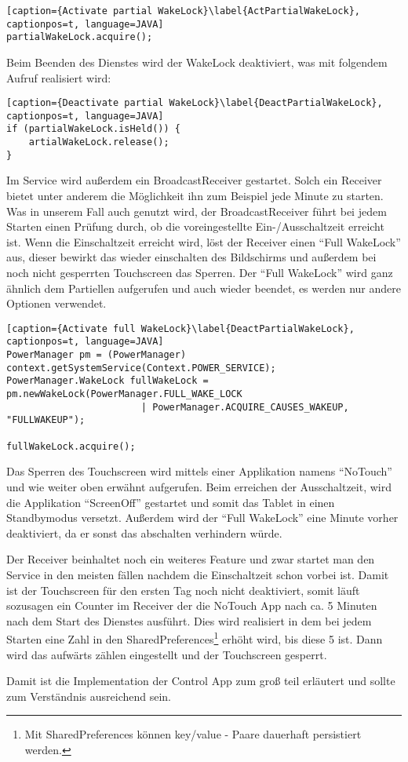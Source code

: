 \begin{flushleft}
\begin{lstlisting}[caption={Activate partial WakeLock}\label{ActPartialWakeLock}, captionpos=t, language=JAVA]
partialWakeLock.acquire();
\end{lstlisting}

Beim Beenden des Dienstes wird der WakeLock deaktiviert, was mit folgendem Aufruf realisiert wird:
\begin{lstlisting}[caption={Deactivate partial WakeLock}\label{DeactPartialWakeLock}, captionpos=t, language=JAVA]
if (partialWakeLock.isHeld()) {
	artialWakeLock.release();
}
\end{lstlisting}

Im Service wird außerdem ein BroadcastReceiver gestartet. Solch ein Receiver bietet unter anderem die Möglichkeit ihn zum Beispiel jede Minute zu starten. Was in unserem Fall auch genutzt wird, der BroadcastReceiver führt bei jedem Starten einen Prüfung durch, ob die voreingestellte Ein-/Ausschaltzeit erreicht ist. Wenn die Einschaltzeit erreicht wird, löst der Receiver einen ``Full WakeLock'' aus, dieser bewirkt das wieder einschalten des Bildschirms und außerdem bei noch nicht gesperrten Touchscreen das Sperren. Der ``Full WakeLock'' wird ganz ähnlich dem Partiellen aufgerufen und auch wieder beendet, es werden nur andere Optionen verwendet.
\begin{lstlisting}[caption={Activate full WakeLock}\label{DeactPartialWakeLock}, captionpos=t, language=JAVA]
PowerManager pm = (PowerManager) context.getSystemService(Context.POWER_SERVICE);
PowerManager.WakeLock fullWakeLock = pm.newWakeLock(PowerManager.FULL_WAKE_LOCK
						| PowerManager.ACQUIRE_CAUSES_WAKEUP, "FULLWAKEUP");
						
fullWakeLock.acquire();
\end{lstlisting}

Das Sperren des Touchscreen wird mittels einer Applikation namens ``NoTouch'' und wie weiter oben erwähnt aufgerufen.
Beim erreichen der Ausschaltzeit, wird die Applikation ``ScreenOff'' gestartet und somit das Tablet in einen Standbymodus versetzt. Außerdem wird der ``Full WakeLock'' eine Minute vorher deaktiviert, da er sonst das abschalten verhindern würde.

Der Receiver beinhaltet noch ein weiteres Feature und zwar startet man den Service in den meisten fällen nachdem die Einschaltzeit schon vorbei ist. Damit ist der Touchscreen für den ersten Tag noch nicht deaktiviert, somit läuft sozusagen ein Counter im Receiver der die NoTouch App nach ca. 5 Minuten nach dem Start des Dienstes ausführt. Dies wird realisiert in dem bei jedem Starten eine Zahl in den SharedPreferences\footnote{Mit SharedPreferences können key/value - Paare dauerhaft persistiert werden.} erhöht wird, bis diese 5 ist. Dann wird das aufwärts zählen eingestellt und der Touchscreen gesperrt.

Damit ist die Implementation der Control App zum groß teil erläutert und sollte zum Verständnis ausreichend sein.

\end{flushleft}
